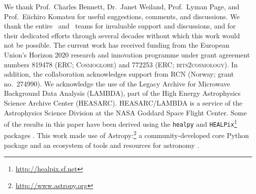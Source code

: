 \begin{acknowledgements}
  We thank Prof.~Charles Bennett, Dr.~Janet Weiland, Prof.~Lyman Page, and
  Prof.~Eiichiro Komatsu for useful suggestions, comments, and discussions.
  We thank the entire \Planck\ and \WMAP\ teams for
  invaluable support and discussions, and for their dedicated efforts
  through several decades without which this work would not be
  possible. The current work has received funding from the European
  Union’s Horizon 2020 research and innovation programme under grant
  agreement numbers 819478 (ERC; \textsc{Cosmoglobe}) and 772253 (ERC;
  \textsc{bits2cosmology}).
  In
  addition, the collaboration acknowledges support from
  RCN (Norway; grant no.\ 274990).
  We acknowledge the use of the Legacy Archive for Microwave Background Data
  Analysis (LAMBDA), part of the High Energy Astrophysics Science Archive Center
  (HEASARC). HEASARC/LAMBDA is a service of the Astrophysics Science Division at
  the NASA Goddard Space Flight Center.  
  Some of the results in this paper have been derived using the \texttt{healpy}
  and \texttt{HEALPix}\footnote{\url{http://healpix.sf.net}} packages
  \citep{gorski2005, Zonca2019}.  This work made use of
  Astropy:\footnote{\url{http://www.astropy.org}} a community-developed
  core Python package and an ecosystem of tools and resources for
  astronomy \citep{astropy:2013, astropy:2018, astropy:2022}.
\end{acknowledgements}
